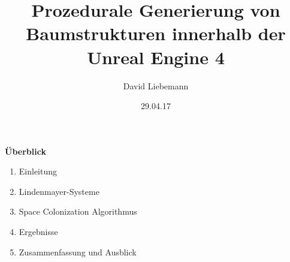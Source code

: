 \documentclass[20pt,landscape]{extarticle}
\title{Prozedurale Generierung von Baumstrukturen innerhalb der Unreal Engine 4}
\author{David Liebemann}
\date{29.04.17}
\begin{document}
\mytitlepage

\newpage
\noindent
{\Large \textbf{Überblick}} 
\slidetitle{}
\begin{enumerate}
	\item Einleitung 
	\item Lindenmayer-Systeme
	\item Space Colonization Algorithmus
	\item Ergebnisse
	\item Zusammenfassung und Ausblick
\end{enumerate}





%







\end{document}
